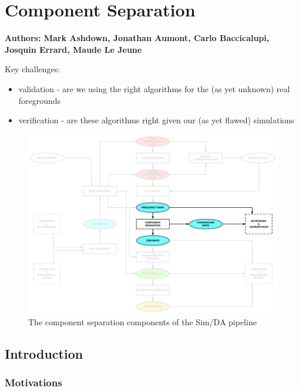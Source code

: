 
\section{Component Separation}

\textbf{ Authors: Mark Ashdown, Jonathan Aumont, Carlo Baccicalupi, Josquin Errard, Maude Le Jeune}

Key challenges:
\begin{itemize}
\item validation - are we using the right algorithms for the (as yet unknown) real foregrounds
\item verification - are these algorithms right given our (as yet flawed) simulations
\end{itemize}

\begin{figure}[htbp]
\centering
\includegraphics[width=1\textwidth]{Analysis/cs}
\caption{The component separation components of the Sim/DA pipeline}
\label{default}
\end{figure}


\subsection{Introduction}


\subsubsection{Motivations}

